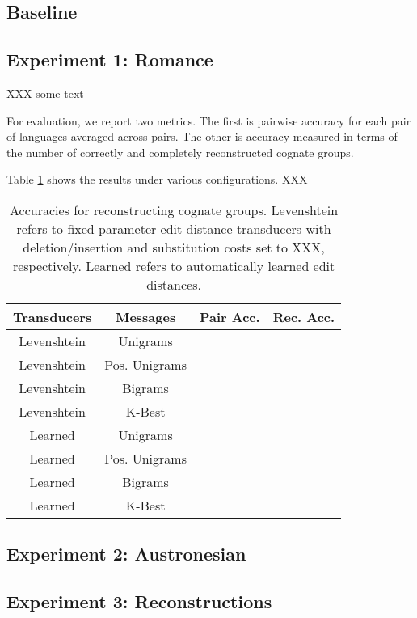 \documentclass[11pt,a4paper]{article}
\begin{document}
\subsection{Baseline}

\subsection{Experiment 1: Romance}

XXX some text


For evaluation, we report two metrics. The first is pairwise accuracy
for each pair of languages averaged across pairs. The other
is accuracy measured in terms of the number of correctly and
completely reconstructed cognate groups. 

Table \ref{tbl:exp1} shows the results under various configurations. XXX

\begin{table}
  \begin{tabular}{|c|c|c|c|}
    Transducers & Messages & Pair Acc. & Rec. Acc.\\
    \hline
    \hline
    Levenshtein&Unigrams & & \\
    Levenshtein&Pos. Unigrams & & \\
    Levenshtein&Bigrams & & \\
    Levenshtein&K-Best & & \\
    \hline
    Learned&Unigrams & & \\
    Learned&Pos. Unigrams & & \\
    Learned&Bigrams & & \\
    Learned&K-Best & & \\
  \end{tabular}
  \caption{Accuracies for reconstructing cognate groups. Levenshtein
  refers to fixed parameter edit distance transducers with
  deletion/insertion and substitution costs set to XXX, respectively.
  Learned refers to automatically learned edit distances.}
  \label{tbl:exp1}
\end{table}

\subsection{Experiment 2: Austronesian}

\subsection{Experiment 3: Reconstructions}
\end{document}
